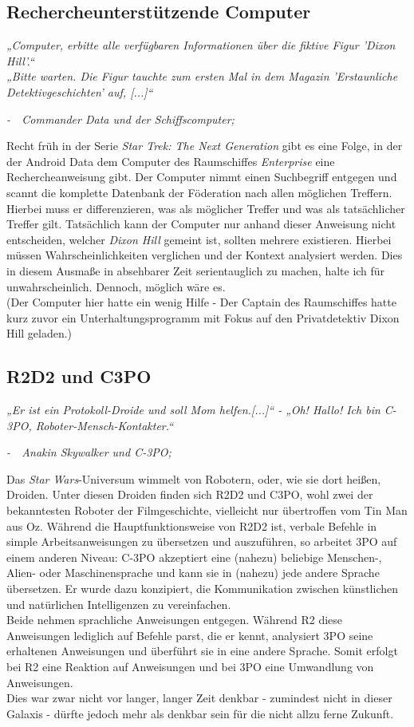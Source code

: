 \documentclass[12pt,twoside]{article}
\theoremstyle{plain}
\theoremstyle{definition}
\theoremstyle{remark}
\begin{document}
\subsection{Rechercheunterstützende Computer}
\label{ssec:data}
\textit{„Computer, erbitte alle verfügbaren Informationen über die fiktive Figur 'Dixon Hill'.“\\
        „Bitte warten. Die Figur tauchte zum ersten Mal in dem Magazin 'Erstaunliche Detektivgeschichten' auf, [...]“}
\begin{flushright}
    \textit{-~~Commander Data und der Schiffscomputer; \cite{TNG112}}
\end{flushright}
Recht früh in der Serie \textit{Star Trek: The Next Generation} gibt es eine Folge, in der der Android Data dem Computer des Raumschiffes \textit{Enterprise} eine Rechercheanweisung gibt.
Der Computer nimmt einen Suchbegriff entgegen und scannt die komplette Datenbank der Föderation nach allen möglichen Treffern.
Hierbei muss er differenzieren, was als möglicher Treffer und was als tatsächlicher Treffer gilt.
Tatsächlich kann der Computer nur anhand dieser Anweisung nicht entscheiden, welcher \textit{Dixon Hill} gemeint ist, sollten mehrere existieren.
Hierbei müssen Wahrscheinlichkeiten verglichen und der Kontext analysiert werden.
Dies in diesem Ausmaße in absehbarer Zeit serientauglich zu machen, halte ich für unwahrscheinlich. Dennoch, möglich wäre es.\\
(Der Computer hier hatte ein wenig Hilfe - Der Captain des Raumschiffes hatte kurz zuvor ein Unterhaltungsprogramm mit Fokus auf den Privatdetektiv Dixon Hill geladen.)
\subsection{R2D2 und C3PO}
\label{ssec:r2d2}
\textit{„Er ist ein Protokoll-Droide und soll Mom helfen.[...]“ - „Oh! Hallo! Ich bin C-3PO, Roboter-Mensch-Kontakter.“}
\begin{flushright}
    \textit{-~~Anakin Skywalker und C-3PO; \cite{SWEP1}}
\end{flushright}
Das \textit{Star Wars}-Universum wimmelt von Robotern, oder, wie sie dort heißen, Droiden.
Unter diesen Droiden finden sich R2D2 und C3PO, wohl zwei der bekanntesten Roboter der Filmgeschichte, vielleicht nur übertroffen vom Tin Man aus Oz.
Während die Hauptfunktionsweise von R2D2 ist, verbale Befehle in simple Arbeitsanweisungen zu übersetzen und auszuführen, so arbeitet 3PO auf einem anderen Niveau:
C-3PO akzeptiert eine (nahezu) beliebige Menschen-, Alien- oder Maschinensprache und kann sie in (nahezu) jede andere Sprache übersetzen.
Er wurde dazu konzipiert, die Kommunikation zwischen künstlichen und natürlichen Intelligenzen zu vereinfachen.\\
Beide nehmen sprachliche Anweisungen entgegen.
Während R2 diese Anweisungen lediglich auf Befehle parst, die er kennt, analysiert 3PO seine erhaltenen Anweisungen und überführt sie in eine andere Sprache.
Somit erfolgt bei R2 eine Reaktion auf Anweisungen und bei 3PO eine Umwandlung von Anweisungen.\\
Dies war zwar nicht vor langer, langer Zeit denkbar - zumindest nicht in dieser Galaxis - dürfte jedoch mehr als denkbar sein für die nicht allzu ferne Zukunft.
\end{document}
